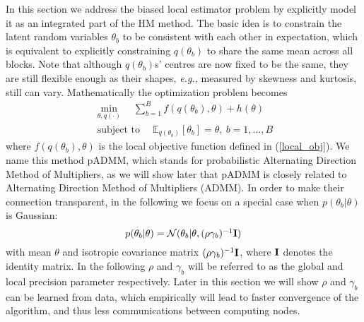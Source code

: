 \documentclass{article}
\DeclareMathOperator*{\st}{subject~to}
\newcommand{\eg}[0]{\emph{e.g., }}
\newcommand{\Imat}[0]{\ensuremath{{\bf I}}\xspace}
\newcommand{\1}[0]{\ensuremath{\boldsymbol{1}}\xspace}
\begin{document}
In this section we address the biased local estimator problem by explicitly model it as an integrated part of the HM method. The basic idea is to constrain the latent random variables $\theta_b$ to be consistent with each other in expectation, which is equivalent to explicitly constraining $q(\theta_b)$ to share the same mean across all blocks. Note that although $q(\theta_b)$s' centres are now fixed to be the same, they are still flexible enough as their shapes, \eg measured by skewness and kurtosis, still can vary. Mathematically the optimization problem becomes
\begin{equation}\label{padmm}
\begin{gathered}
\textstyle\min_{\theta, q(\cdot)} \quad\textstyle\sum_{b=1}^B f(q(\theta_b), \theta) + h(\theta)\\
\textstyle\st \quad \mathbb{E}_{q(\theta_b)}[\theta_b] = \theta, ~ b = 1, \ldots, B
\end{gathered}
\end{equation}
where $f(q(\theta_b), \theta)$ is the local objective function defined in (\ref{local_obj}). We name this method pADMM, which stands for probabilistic Alternating Direction Method of Multipliers, as we will show later that pADMM is closely related to Alternating Direction Method of Multipliers (ADMM). In order to make their connection transparent, in the following we focus on a special case when $p(\theta_b|\theta)$ is Gaussian:
\begin{equation}\label{gaussian_prior}
\textstyle p(\theta_b|\theta) = \mathcal{N}(\theta_b | \theta, (\rho\gamma_b)^{-1}\Imat)
\end{equation}
with mean $\theta$ and isotropic covariance matrix $(\rho\gamma_b)^{-1}\Imat$, where $\Imat$ denotes the identity matrix. In the following $\rho$ and $\gamma_b$ will be referred to as the global and local precision parameter respectively. Later in this section we will show $\rho$ and $\gamma_b$ can be learned from data, which empirically will lead to faster convergence of the algorithm, and thus less communications between computing nodes.
\end{document}

